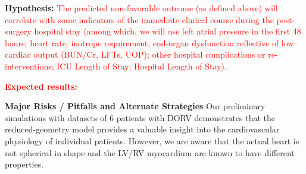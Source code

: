 


\textbf{Hypothesis:} 
\textcolor{red}{
The predicted non-favorable outcome (as defined above) will correlate with some indicators of the immediate clinical course during the post-surgery hospital stay (among which, we will use left atrial pressure in the first 48 hours; heart rate; inotrope requirement; end-organ dysfunction reflective of low cardiac output (BUN/Cr, LFTs, UOP); other hospital complications or re-interventions; ICU Length of Stay; Hospital Length of Stay).
}

\textbf{\textcolor{red}{Expected results:}} 

\textbf{Major Risks / Pitfalls and Alternate Strategies}
Our preliminary simulations with datasets of 6 patients with DORV demonstrates that the reduced-geometry model provides a valuable insight into the cardiovascular physiology of individual patients. However, we are aware that the actual heart is not spherical in shape and the LV/RV myocardium are known to have different properties. 

